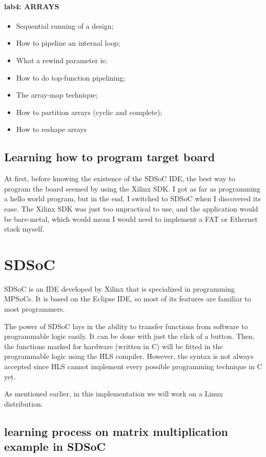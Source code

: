 \paragraph{lab4: ARRAYS}
\begin{itemize}
	\item Sequential running of a design;
	\item How to pipeline an internal loop;
	\item What a rewind parameter is;
	\item How to do top-function pipelining;
	\item The array-map technique;
	\item How to partition arrays (cyclic and complete);
	\item How to reshape arrays
\end{itemize}

\subsection{Learning how to program target board}

At first, before knowing the existence of the SDSoC IDE, the best way to program the board seemed by using the Xilinx SDK. I got as far as programming a hello world program, but in the end, I switched to SDSoC when I discovered its ease. The Xilinx SDK was just too unpractical to use, and the application would be bare-metal, which would mean I would need to implement a FAT or Ethernet stack myself.

\section{SDSoC}

SDSoC is an IDE developed by Xilinx that is specialized in programming MPSoCs. It is based on the Eclipse IDE, so most of its features are familiar to most programmers. 

The power of SDSoC lays in the ability to transfer functions from software to programmable logic easily. It can be done with just the click of a button. Then, the functions marked for hardware (written in C) will be fitted in the programmable logic using the HLS compiler. However, the syntax is not always accepted since HLS cannot implement every possible programming technique in C yet.

As mentioned earlier, in this implementation we will work on a Linux distribution.

\subsection{learning process on matrix multiplication example in SDSoC}

